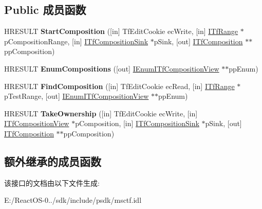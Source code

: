 \subsection*{Public 成员函数}
\begin{DoxyCompactItemize}
\item 
\mbox{\label{interface_i_tf_context_composition_a9dc4d530f320231c5bd4cbcbc05959e2}} 
H\+R\+E\+S\+U\+LT {\bfseries Start\+Composition} (\mbox{[}in\mbox{]} Tf\+Edit\+Cookie ec\+Write, \mbox{[}in\mbox{]} \hyperlink{interface_i_tf_range}{I\+Tf\+Range} $\ast$p\+Composition\+Range, \mbox{[}in\mbox{]} \hyperlink{interface_i_tf_composition_sink}{I\+Tf\+Composition\+Sink} $\ast$p\+Sink, \mbox{[}out\mbox{]} \hyperlink{interface_i_tf_composition}{I\+Tf\+Composition} $\ast$$\ast$pp\+Composition)
\item 
\mbox{\label{interface_i_tf_context_composition_a19126f6ac8131578a182675f64f38d15}} 
H\+R\+E\+S\+U\+LT {\bfseries Enum\+Compositions} (\mbox{[}out\mbox{]} \hyperlink{interface_i_enum_i_tf_composition_view}{I\+Enum\+I\+Tf\+Composition\+View} $\ast$$\ast$pp\+Enum)
\item 
\mbox{\label{interface_i_tf_context_composition_a58a01ce46921e16f21d01dc31d324dc8}} 
H\+R\+E\+S\+U\+LT {\bfseries Find\+Composition} (\mbox{[}in\mbox{]} Tf\+Edit\+Cookie ec\+Read, \mbox{[}in\mbox{]} \hyperlink{interface_i_tf_range}{I\+Tf\+Range} $\ast$p\+Test\+Range, \mbox{[}out\mbox{]} \hyperlink{interface_i_enum_i_tf_composition_view}{I\+Enum\+I\+Tf\+Composition\+View} $\ast$$\ast$pp\+Enum)
\item 
\mbox{\label{interface_i_tf_context_composition_a8403285ac1028010bd6d94f7a7bb4ab7}} 
H\+R\+E\+S\+U\+LT {\bfseries Take\+Ownership} (\mbox{[}in\mbox{]} Tf\+Edit\+Cookie ec\+Write, \mbox{[}in\mbox{]} \hyperlink{interface_i_tf_composition_view}{I\+Tf\+Composition\+View} $\ast$p\+Composition, \mbox{[}in\mbox{]} \hyperlink{interface_i_tf_composition_sink}{I\+Tf\+Composition\+Sink} $\ast$p\+Sink, \mbox{[}out\mbox{]} \hyperlink{interface_i_tf_composition}{I\+Tf\+Composition} $\ast$$\ast$pp\+Composition)
\end{DoxyCompactItemize}
\subsection*{额外继承的成员函数}


该接口的文档由以下文件生成\+:\begin{DoxyCompactItemize}
\item 
E\+:/\+React\+O\+S-\/0../sdk/include/psdk/msctf.\+idl\end{DoxyCompactItemize}
